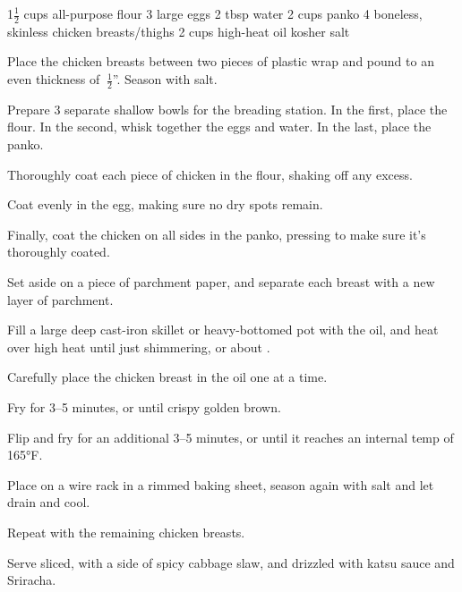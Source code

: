 \dishtype{\main}
\begin{ingreds}
    1$\frac{1}{2}$ cups all-purpose flour
    3 large eggs
    2 tbsp water
    2 cups panko
    4 boneless, skinless chicken breasts/thighs
    2 cups high-heat oil
    kosher salt
\end{ingreds}
\begin{method}
    Place the chicken breasts between two pieces of plastic wrap and pound to an even thickness of $~\frac{1}{2}$''. Season with salt.\par
    Prepare 3 separate shallow bowls for the breading station. In the first, place the flour. In the second, whisk together the eggs and water. In the last, place the panko.\par
    Thoroughly coat each piece of chicken in the flour, shaking off any excess.\par
    Coat evenly in the egg, making sure no dry spots remain.\par
    Finally, coat the chicken on all sides in the panko, pressing to make sure it's thoroughly coated.\par
    Set aside on a piece of parchment paper, and separate each breast with a new layer of parchment.\par
    Fill a large deep cast-iron skillet or heavy-bottomed pot with the oil, and heat over high heat until just shimmering, or about .\par
    Carefully place the chicken breast in the oil one at a time.\par
    Fry for 3--5 minutes, or until crispy golden brown.\par
    Flip and fry for an additional 3--5 minutes, or until it reaches an internal temp of 165°F.\par
    Place on a wire rack in a rimmed baking sheet, season again with salt and let drain and cool.\par Repeat with the remaining chicken breasts.\par
    Serve sliced, with a side of spicy cabbage slaw, and drizzled with katsu sauce and Sriracha.
\end{method}